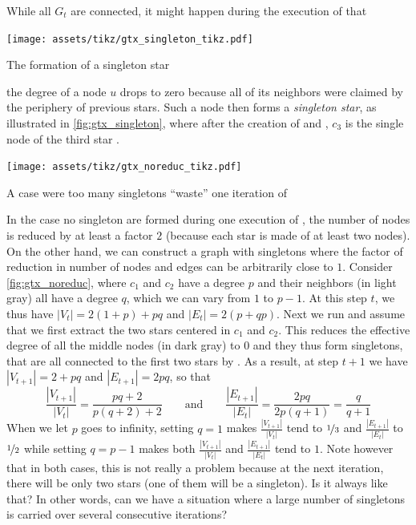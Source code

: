While all $G_t$ are connected, it might happen during the execution of \extractStar{} that%
\begin{marginfigure}
  \centering
  \texttt{[image: assets/tikz/gtx\_singleton\_tikz.pdf]}
  \caption{The formation of a singleton star}
  \label{fig:gtx_singleton}
\end{marginfigure}
the degree of a node $u$ drops to zero because all of its neighbors were claimed by the
periphery of previous stars. Such a node then forms a \emph{singleton star}, as illustrated in
\autoref{fig:gtx_singleton}, where after the creation of  and , $c_3$ is the
single node of the third star .%
\begin{marginfigure}
  \centering
  \texttt{[image: assets/tikz/gtx\_noreduc\_tikz.pdf]}
  \caption{A case were too many singletons \enquote{waste} one iteration of \gtx{}}
  \label{fig:gtx_noreduc}
\end{marginfigure}
In the case no singleton are formed during one execution of \extractStar{}, the number of nodes is
reduced by at least a factor $2$ (because each star is made of at least two nodes). On the other hand, we can
construct a graph with singletons where the factor of reduction in number of nodes and edges can be
arbitrarily close to $1$. Consider \autoref{fig:gtx_noreduc}, where $c_1$ and $c_2$ have a degree
$p$ and their neighbors (in light gray) all have a degree $q$, which we can vary from $1$ to $p-1$.
At this step $t$, we thus have $|V_t| = 2(1+p)+pq$ and $|E_t| = 2(p+qp)$. Next we run \extractStar{}
and assume that we first extract the two stars centered in $c_1$ and $c_2$. This reduces the
effective degree of all the middle nodes (in dark gray) to $0$ and they thus form singletons, that
are all connected to the first two stars by \collapseStar{}. As a result, at step $t+1$ we have
$|V_{t+1}| = 2 + pq$ and $|E_{t+1}| = 2pq$, so that
\begin{equation*}
\frac{|V_{t+1}|}{|V_t|} = \frac{pq+2}{p(q+2) + 2} \qquad \text{and} \qquad
\frac{|E_{t+1}|}{|E_t|} = \frac{2pq}{2p(q+1)} = \frac{q}{q+1}
\end{equation*}
When we let $p$ goes to infinity, setting $q=1$ makes $\frac{|V_{t+1}|}{|V_t|}$ tend to
$\nicefrac{1}{3}$ and $\frac{|E_{t+1}|}{|E_t|}$ to $\nicefrac{1}{2}$ while setting $q=p-1$ makes
both $\frac{|V_{t+1}|}{|V_t|}$ and $\frac{|E_{t+1}|}{|E_t|}$ tend to $1$. Note however that in both
cases, this is not really a problem because at the next iteration, there will be only two stars (one
of them will be a singleton). Is it always like that? In other words, can we have a situation where
a large number of singletons is carried over several consecutive iterations?

